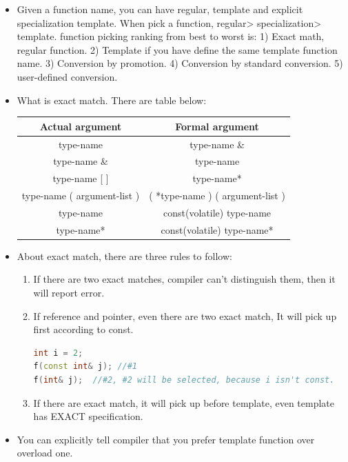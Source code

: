 \documentclass[a4paper,11pt,twoside]{book}
\newcommand{\tophline}{\hline }
\newcommand{\tophline}{ }
\begin{document}
\begin{itemize}
	\item Given a function name, you can have regular, template and explicit specialization template. When pick a function, regular> specialization> template. function picking ranking from best to worst is: 
		1) Exact math, regular function.
		2) Template if you have define the same template function name.
		3) Conversion by promotion.
		4) Conversion by standard conversion.
		5) user-defined conversion.


\item What is exact match. There are table below:

\begin{center}
	\begin{tabular}{|c|c|}
	\tophline
	Actual argument & Formal argument \\
	\tophline
	type-name & type-name \& \\
	\tophline
	type-name \& & type-name \\ \tophline
	type-name [ ] &  type-name* \\ \tophline
	type-name ( argument-list ) & ( *type-name ) ( argument-list ) \\ \tophline
	type-name  & const(volatile) type-name \\ \tophline
	type-name*  & const(volatile) type-name*  \\ \tophline
	\end{tabular}
\end{center}

	\item About exact match, there are three rules to follow:
	\begin{enumerate}
		\item If there are two exact matches, compiler can't distinguish them, then it will report error.
		
		\item If reference and pointer, even there are two exact match, It will pick up first according to const.
\begin{lstlisting}[frame=single, language=c++]
int i = 2;
f(const int& j); //#1
f(int& j);  //#2, #2 will be selected, because i isn't const.
\end{lstlisting}

		\item If there are exact match, it will pick up before template, even template has EXACT specification.
\end{enumerate}

	\item You can explicitly tell compiler that you prefer template function over overload one.


\end{itemize}
\end{document}
